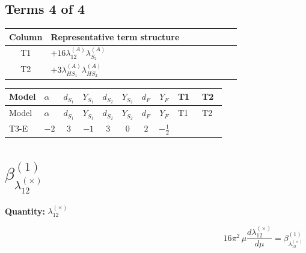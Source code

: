 \documentclass[8pt]{article}
\begin{document}
\begin{landscape}
\subsection*{Terms 4 of 4}
\begin{center}
\begin{tabular}{@{}c >{\raggedright\arraybackslash}p{0.82\linewidth}@{}}
\toprule
Column & Representative term structure \\
\midrule
T1 & \(\displaystyle +16 {\lambda_{12}^{(A)}} {\lambda_{S_2}^{(A)}}\) \\
\midrule
T2 & \(\displaystyle +3 {\lambda_{HS_1}^{(A)}} {\lambda_{HS_2}^{(A)}}\) \\
\midrule
\bottomrule
\end{tabular}
\end{center}
\smallskip
\tiny
\begin{longtable}{@{}llcccccc >{\raggedright\arraybackslash}p{0.21\linewidth} >{\raggedright\arraybackslash}p{0.21\linewidth}@{}}
\toprule
Model & $\alpha$ & $d_{S_1}$ & $Y_{S_1}$ & $d_{S_2}$ & $Y_{S_2}$ & $d_F$ & $Y_F$ & T1 & T2 \\
\midrule
\endfirsthead
\toprule
Model & $\alpha$ & $d_{S_1}$ & $Y_{S_1}$ & $d_{S_2}$ & $Y_{S_2}$ & $d_F$ & $Y_F$ & T1 & T2 \\
\midrule
\endhead
T3-E & $-2$ & $3$ & $-1$ & $3$ & $0$ & $2$ & $-\frac{1}{2}$ & \scriptsize\adjustbox{max width=\linewidth}{$\begin{gathered} +16 {\lambda_{12}^{(A)}} {\lambda_{S_2}^{(A)}}\end{gathered}$} & \scriptsize\adjustbox{max width=\linewidth}{$\begin{gathered} +3 {\lambda_{HS_1}^{(A)}} {\lambda_{HS_2}^{(A)}}\end{gathered}$} \\
\midrule
\bottomrule
\end{longtable}
\clearpage
\section*{$\beta_{\lambda_{12}^{(\times)}}^{(1)}$}
\noindent\textbf{Quantity: }$\lambda_{12}^{(\times)}$\par\smallskip
\[16\pi^2\,\mu\frac{d \lambda_{12}^{(\times)}}{d\mu}=\beta_{\lambda_{12}^{(\times)}}^{(1)}\]

\end{landscape}
\end{document}
